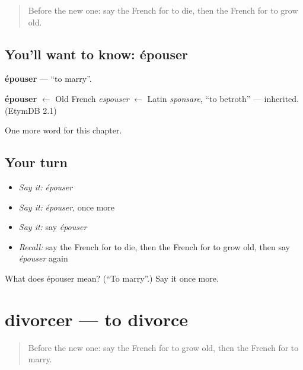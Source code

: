 \label{lesson:FR-C207-epouser}



\begin{quote}
Before the new one: say the French for to die, then the French for to grow old.
\end{quote}

\subsection*{You'll want to know: épouser}
\textbf{épouser} — \textquotedblleft{}to marry\textquotedblright{}.

\begin{cousinweb}
\textbf{épouser} $\leftarrow$ Old French \emph{espouser} $\leftarrow$ Latin \emph{sponsare}, \textquotedblleft{}to betroth\textquotedblright{} — inherited. (EtymDB 2.1)
\end{cousinweb}

\begin{grammarlens}[title={What you've built}]
One more word for this chapter.
\end{grammarlens}

\subsection*{Your turn}
\begin{itemize}
\raggedright
  \item \emph{Say it:} \emph{épouser}
  \item \emph{Say it:} \emph{épouser}, once more
  \item \emph{Say it:} say \emph{épouser}
  \item \emph{Recall:} say the French for to die, then the French for to grow old, then say \emph{épouser} again
\end{itemize}

\begin{tcolorbox}[breakable,colback=teal!4,colframe=teal!35!black,title={Before you move on}]
What does épouser mean? (\textquotedblleft{}To marry\textquotedblright{}.) Say it once more.
\end{tcolorbox}
\section[divorcer]{divorcer — to divorce}

\label{lesson:FR-C207-divorcer}



\begin{quote}
Before the new one: say the French for to grow old, then the French for to marry.
\end{quote}

